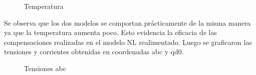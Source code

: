\documentclass[a4paper, 10pt, onecolumn,journal]{ieeeconf}
\begin{document}
\begin{figure}[H]
	\centering
	\begin{adjustbox}{max width=\columnwidth}
	\end{adjustbox}
	\caption{Temperatura }
	\label{Temperatura}
\end{figure}
Se observa que los dos modelos se comportan prácticamente de la misma manera ya que la temperatura aumenta poco. Esto evidencia la eficacia de las compensaciones realizadas en el modelo NL realimentado.
Luego se graficaron las tensiones y corrientes obtenidas en coordenadas abc y qd0.
\begin{figure}[H]
	\centering
	\begin{adjustbox}{max width=\columnwidth}
	\end{adjustbox}
	\caption{Tensiones abc}
	\label{Tensiones abc}
\end{figure}
\end{document}
